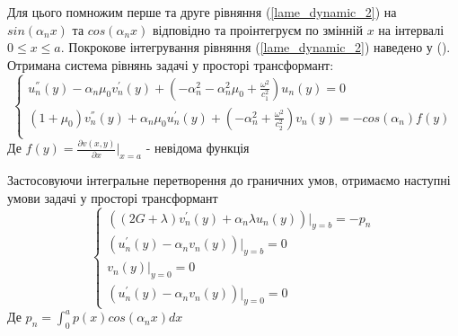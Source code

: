 Для цього помножим перше та друге рівняння (\ref{lame_dynamic_2}) на $sin(\alpha_n x)$ та $cos(\alpha_n x)$ відповідно та проінтегруєм по змінній $x$ на інтервалі $0 \le x \le a$.
Покрокове інтегрування рівняння (\ref{lame_dynamic_2}) наведено у ().
Отримана система рівнянь задачі у просторі трансформант:
\begin{equation}\label{transf_dynamic_2}
    \begin{cases}
        u_n^{''}(y) - \alpha_n \mu_0 v_n^{'}(y) + (-\alpha_n^2 -\alpha_n^2 \mu_0 + \frac{\omega^2}{c_1^2}) u_n(y) = 0 \\
        (1 + \mu_0) v_n^{''}(y) + \alpha_n \mu_0 u_n^{'}(y) + (- \alpha_n^2 + \frac{\omega^2}{c_2^2}) v_n(y) = -cos(\alpha_n) f(y)\\
    \end{cases}
\end{equation}
Де $f(y) = \frac{\partial v(x,y)}{\partial x}|_{x=a}$ - невідома функція

Застосовуючи інтегральне перетворення до граничних умов,
отримаємо наступні умови задачі у просторі трансформант
\begin{equation}\label{transf_bound_dynamic_2}
    \begin{cases}
        \left( (2G + \lambda)v_n^{'}(y) + \alpha_n \lambda u_n(y) \right)|_{y=b} = -p_n \\
        \left(u_n^{'}(y) - \alpha_n v_n(y)  \right)|_{y=b} = 0 \\
        v_n(y)|_{y=0} = 0 \\
        \left(u_n^{'}(y) - \alpha_n v_n(y)  \right)|_{y=0} = 0
    \end{cases}
\end{equation}
Де $p_n = \int_{0}^{a} p(x) cos(\alpha_n x) dx$

